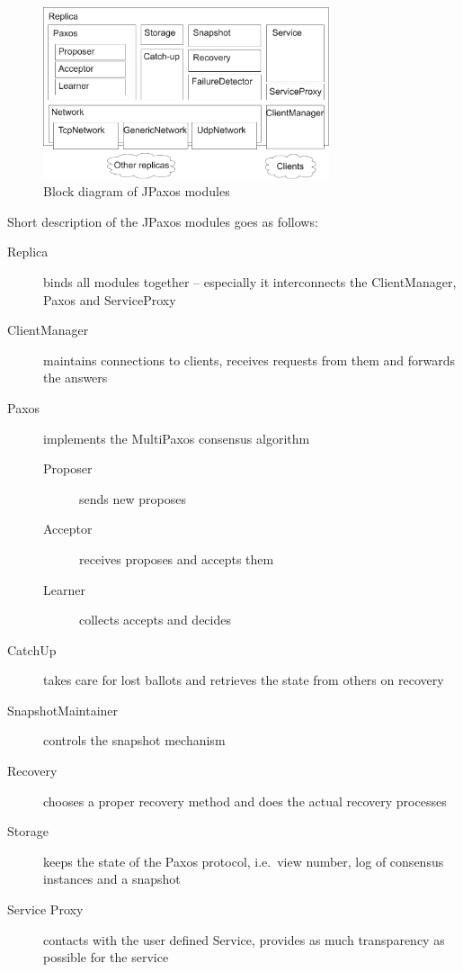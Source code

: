 \begin{figure}[h]
 \centering
 \includegraphics[keepaspectratio, width=0.75\textwidth]{architecture/replica_architecture.pdf}
 \caption{Block diagram of JPaxos modules}
 \label{fig:replica_architecture}
\end{figure}

Short description of the JPaxos modules goes as follows:

\begin{description}
  \item[Replica ] binds all modules together -- especially it interconnects the ClientManager, Paxos and ServiceProxy
  \item[ClientManager ] maintains connections to clients, receives requests from them and forwards the answers
  \item[Paxos ] implements the MultiPaxos consensus algorithm
  \begin{description}
    \item[Proposer ] sends new proposes
    \item[Acceptor ] receives proposes and accepts them
    \item[Learner ] collects accepts and decides
  \end{description}
  \item[CatchUp ] takes care for lost ballots and retrieves the state from others on recovery
  \item[SnapshotMaintainer ] controls the snapshot mechanism
  \item[Recovery ] chooses a proper recovery method and does the actual recovery processes
  \item[Storage ] keeps the state of the Paxos protocol, i.e.\ view number, log of consensus instances and a snapshot
  \item[Service Proxy ] contacts with the user defined Service, provides as much trans\-pa\-rency as possible for the service
\end{description}

